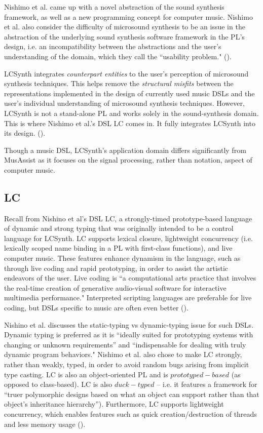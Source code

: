\documentclass{report}
\newcommand\citeparen[1]{(\cite{#1})}
\begin{document}
Nishimo et al. came up with a novel  abstraction of the sound synthesis framework, as well  as a new programming concept for computer music. Nishimo et al. also consider the difficulty of microsound synthesis to be an issue in the abstraction  of the underlying  sound synthesis software framework in the PL's design, i.e. an incompatibility between the abstractions and the user's understanding of the domain, which they call   the ``usability problem." \citeparen{nishino_2012}.

LCSynth integrates \textit{counterpart entities} to  the  user's perception of microsound synthesis techniques.  This helps remove the  \textit{structural misfits} between the representations  implemented in the design of currently used  music DSLs and the user's individual understanding of microsound synthesis techniques. However, LCSynth  is  not  a stand-alone  PL  and works  solely in the sound-synthesis domain. This is where Nishimo et al.'s DSL LC comes in. It fully integrates LCSynth into its design.   
 \citeparen{nishino_2012}.
 
Though a music DSL, LCSynth's application domain differs significantly from MusAssist as it focuses on the signal processing, rather than notation, aspect of computer music.

\subsection{LC}
Recall from  Nishino et al's DSL LC, a strongly-timed prototype-based language of dynamic and strong typing that was originally intended to be  a  control language for LCSynth. LC supports lexical closure, lightweight concurrency (i.e. lexically scoped name binding in a PL with first-class functions),  and live computer  music. These  features enhance dynamism in the language, such as through live coding  and  rapid prototyping,  in order to assist the  artistic endeavors of the user. Live coding is ``a computational arts practice that involves the real-time creation of generative audio-visual software for interactive multimedia performance." Interpreted scripting languages are preferable for live coding, but  DSLs specific to music are often even  better \citeparen{nishino_osaka_nakatsu_2013}.

Nishino et al. discusses the static-typing vs dynamic-typing issue for such DSLs. Dynamic typing is preferred as it is ``ideally suited for prototyping systems with changing or unknown requirements” and ``indispensable for dealing with truly dynamic program behaviors." Nishimo et al. also chose to make LC strongly,  rather than  weakly, typed, in order to avoid random  bugs arising from  implicit type casting. LC is also an object-oriented PL and is $prototyped-based$ (as opposed  to  class-based). LC  is also $duck-typed$ -- i.e. it features a framework for  ``truer polymorphic designs based on what an object can support rather than that object’s inheritance hierarchy”). Furthermore,  LC supports lightweight concurrency, which enables features  such as  quick creation/destruction of threads and less memory usage \citeparen{nishino_osaka_nakatsu_2013}.
\end{document}
